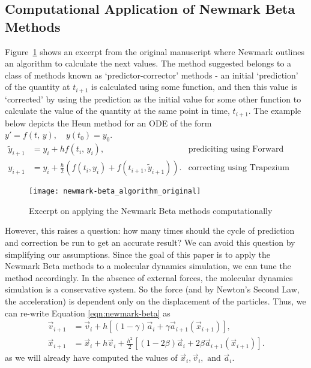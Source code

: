 \documentclass[../Main.tex]{subfiles}
\begin{document}
\subsection{Computational Application of Newmark Beta Methods} \label{subsection:numerical_newmark-beta}
Figure~\ref{fig:newmark-beta_algorithm_original} shows an excerpt from the original manuscript \cite{Newmark1959} where Newmark outlines an algorithm to calculate the next values. The method suggested belongs to a class of methods known as `predictor-corrector' methods - an initial `prediction' of the quantity at $t_{i+1}$ is calculated using some function, and then this value is `corrected' by using the prediction as the initial value for some other function to calculate the value of the quantity at the same point in time, $t_{i+1}$. The example below depicts the Heun method for an ODE of the form $y' = f\left(t\mbox{, }y\right), \quad y\left(t_{0}\right) = y_{0}$.
\begin{align*}
	\tilde{y}_{i+1} & = y_{i} + hf\left(t_{i}\mbox{, }y_{i}\right), & \mbox{prediciting using Forward Euler Method} \\
	y_{i+1} & = y_{i} + \frac{h}{2}\left(f\left(t_{i}, y_{i}\right) + f\left(t_{i+1}, \tilde{y}_{i+1}\right)\right). & \mbox{correcting using Trapezium Rule}
\end{align*}

\begin{figure}[h]
\texttt{[image: newmark-beta\_algorithm\_original]}
\centering
\caption{Excerpt on applying the Newmark Beta methods computationally}
\label{fig:newmark-beta_algorithm_original}
\end{figure}

However, this raises a question: how many times should the cycle of prediction and correction be run to get an accurate result? We can avoid this question by simplifying our assumptions. Since the goal of this paper is to apply the Newmark Beta methods to a molecular dynamics simulation, we can tune the method accordingly. In the absence of external forces, the molecular dynamics simulation is a conservative system. So the force (and by Newton's Second Law, the acceleration) is dependent only on the displacement of the particles. Thus, we can re-write Equation \ref{eqn:newmark-beta} as
\begin{align}
		\vec{v}_{i+1} & = \vec{v}_{i} + h\left[\left(1-\gamma\right)\vec{a}_{i} + \gamma\vec{a}_{i+1}\left(\vec{x}_{i+1}\right)\right], \label{newmark-beta_v} \\
		\vec{x}_{i+1} & = \vec{x}_{i} + h\vec{v}_{i} + \frac{h^2}{2}\left[\left(1-2\beta \right)\vec{a}_{i} + 2\beta\vec{a}_{i+1}\left(\vec{x}_{i+1}\right)\right] \label{newmark-beta_x}. 
\end{align}
as we will already have computed the values of $\vec{x}_{i}, \vec{v}_{i},\mbox{ and }\vec{a}_{i}$.
\end{document}
